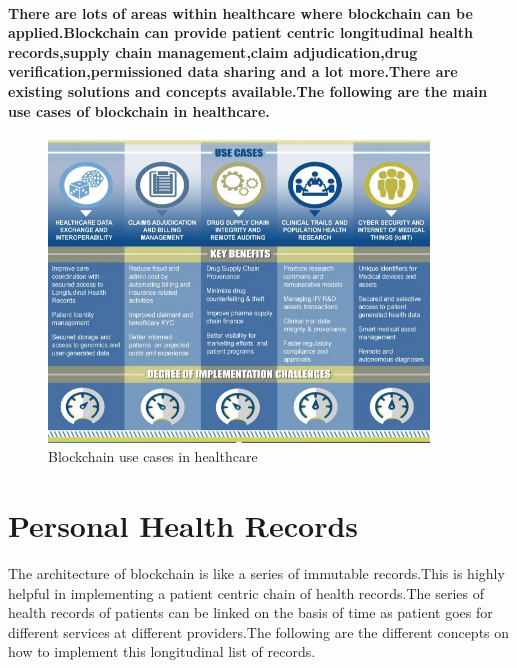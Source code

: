 \documentclass[12pt]{report}
\begin{document}
\paragraph{There are lots of areas within healthcare where blockchain can be applied.Blockchain can provide patient centric longitudinal health records,supply chain management,claim adjudication,drug verification,permissioned data sharing and a lot more.There are existing solutions and concepts available.The following are the main use cases of blockchain in  healthcare.}
\begin{figure}[H]
\centering
\includegraphics[width=0.9\textwidth]{apps.jpg}
\caption{Blockchain use cases in healthcare\cite{13}}
\label{usecase}
\end{figure}
\section{Personal Health Records}
The architecture of blockchain is like a series of immutable records.This is highly helpful in implementing a patient centric chain of health records.The series of health records of patients can be linked on the basis of time as patient goes for different services at different providers.The following are the different concepts on how to implement this longitudinal list of records.
\end{document}
